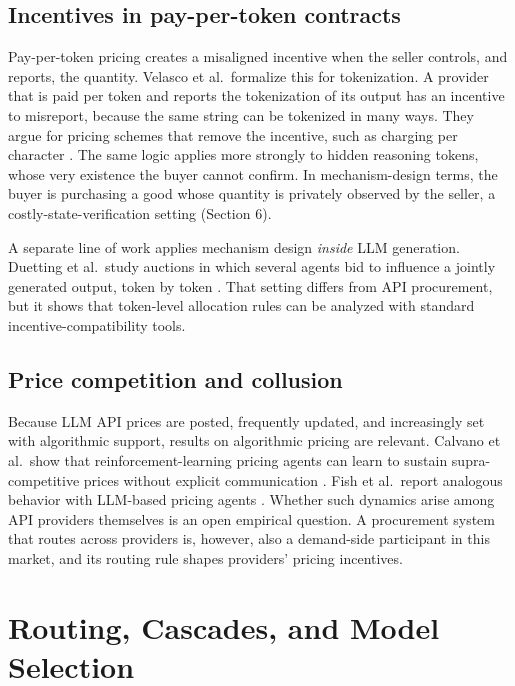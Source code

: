 \documentclass[sigconf]{acmart}
\begin{document}
\subsection{Incentives in pay-per-token contracts}\label{incentives-in-pay-per-token-contracts}

Pay-per-token pricing creates a misaligned incentive when the seller controls, and reports, the quantity. Velasco et al.~formalize this for tokenization. A provider that is paid per token and reports the tokenization of its output has an incentive to misreport, because the same string can be tokenized in many ways. They argue for pricing schemes that remove the incentive, such as charging per character \cite{velasco2025overcharging}. The same logic applies more strongly to hidden reasoning tokens, whose very existence the buyer cannot confirm. In mechanism-design terms, the buyer is purchasing a good whose quantity is privately observed by the seller, a costly-state-verification setting \cite{townsend1979csv} (Section 6).

A separate line of work applies mechanism design \emph{inside} LLM generation. Duetting et al.~study auctions in which several agents bid to influence a jointly generated output, token by token \cite{duetting2024mechanism}. That setting differs from API procurement, but it shows that token-level allocation rules can be analyzed with standard incentive-compatibility tools.

\subsection{Price competition and collusion}\label{price-competition-and-collusion}

Because LLM API prices are posted, frequently updated, and increasingly set with algorithmic support, results on algorithmic pricing are relevant. Calvano et al.~show that reinforcement-learning pricing agents can learn to sustain supra-competitive prices without explicit communication \cite{calvano2020collusion}. Fish et al.~report analogous behavior with LLM-based pricing agents \cite{fish2024collusion}. Whether such dynamics arise among API providers themselves is an open empirical question. A procurement system that routes across providers is, however, also a demand-side participant in this market, and its routing rule shapes providers' pricing incentives.

\section{Routing, Cascades, and Model Selection}\label{routing-cascades-and-model-selection}
\end{document}
